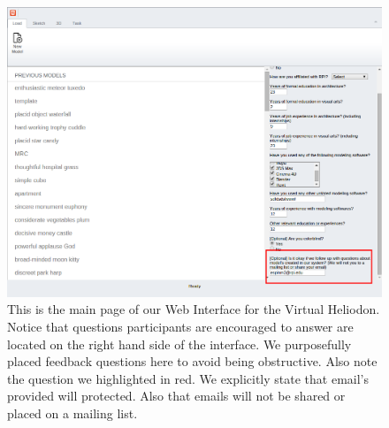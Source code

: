 \documentclass[12pt]{article}
\begin{document}
\begin{figure}[h]
\centering
\includegraphics[scale=0.4]{updated_email}
\caption{This is the main page of our Web Interface for the Virtual Heliodon. Notice that questions participants are encouraged to answer are located on the right hand side of the interface. We purposefully placed feedback questions here to avoid being obstructive. Also note the question  we highlighted in red. We explicitly state that email's provided will protected. Also that emails will not be shared or placed on a mailing list. }
\label{fig:sfig1}
\end{figure}
\end{document}
